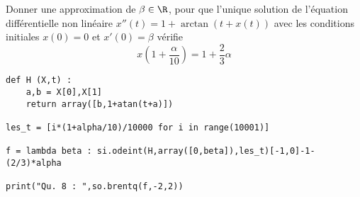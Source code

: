 \question{}
  Donner une approximation de $\beta\in \R$, pour que l'unique
  solution de l'équation différentielle non linéaire $x''(t)=
  1+\arctan(t+x(t))$ avec les conditions initiales $x(0)=0$ et
  $x'(0)=\beta$ vérifie
  \begin{equation*}
    x(1+\frac{\alpha}{10}) = 1 + \frac{2}{3}\alpha
  \end{equation*}
  
  
\begin{lstlisting}
def H (X,t) :
    a,b = X[0],X[1]
    return array([b,1+atan(t+a)])

les_t = [i*(1+alpha/10)/10000 for i in range(10001)]

f = lambda beta : si.odeint(H,array([0,beta]),les_t)[-1,0]-1-(2/3)*alpha

print("Qu. 8 : ",so.brentq(f,-2,2))

\end{lstlisting}
  
